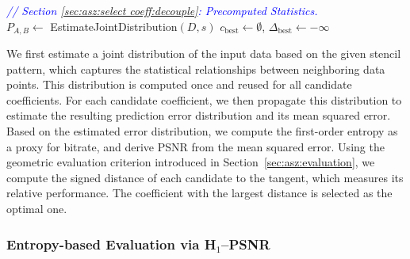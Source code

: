 \begin{algorithm}[h]
\small
\caption{Select Predictor Coefficients}
\label{alg:asz:select coeff}
\textcolor{blue}{\textit{// Section \ref{sec:asz:select coeff:decouple}: Precomputed Statistics.}}\\
$P_{A,B} \leftarrow$ EstimateJointDistribution$(D,s)$\;
$c_{\mathrm{best}} \leftarrow \emptyset$, $\Delta_{\mathrm{best}} \leftarrow -\infty$\;
\;
\end{algorithm}

We first estimate a joint distribution of the input data based on the given stencil pattern, which captures the statistical relationships between neighboring data points.
This distribution is computed once and reused for all candidate coefficients.
For each candidate coefficient, we then propagate this distribution to estimate the resulting prediction error distribution and its mean squared error.
Based on the estimated error distribution, we compute the first-order entropy as a proxy for bitrate, and derive PSNR from the mean squared error.
Using the geometric evaluation criterion introduced in Section~\ref{sec:asz:evaluation}, we compute the signed distance of each candidate to the tangent, which measures its relative performance.
The coefficient with the largest distance is selected as the optimal one.

\subsubsection{Entropy-based Evaluation via H$_1$–PSNR}\label{sec:asz:select coeff:H1}\noindent

